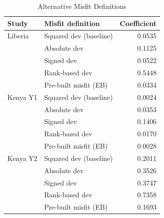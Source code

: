 \begin{table}[htbp]
\centering\small
\caption{Alternative Misfit Definitions}
\label{tab:alt_misfit}
\begin{tabular}{llr}
\toprule
Study & Misfit definition & Coefficient \\
\midrule
Liberia & Squared dev (baseline) & 0.0535 \\
 & Absolute dev & 0.1125 \\
 & Signed dev & 0.0522 \\
 & Rank-based dev & 0.5448 \\
 & Pre-built misfit (EB) & 0.0334 \\
\addlinespace
Kenya Y1 & Squared dev (baseline) & 0.0024 \\
 & Absolute dev & 0.0353 \\
 & Signed dev & 0.1406 \\
 & Rank-based dev & 0.0170 \\
 & Pre-built misfit (EB) & 0.0028 \\
\addlinespace
Kenya Y2 & Squared dev (baseline) & 0.2011 \\
 & Absolute dev & 0.3526 \\
 & Signed dev & 0.3747 \\
 & Rank-based dev & 0.7358 \\
 & Pre-built misfit (EB) & 0.1693 \\
\bottomrule
\end{tabular}
\par\smallskip{}
\end{table}